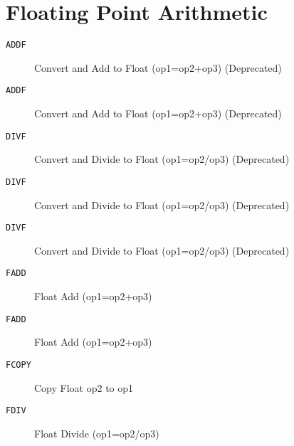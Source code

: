 \section{Floating Point Arithmetic}
\begin{description}
\item[\texttt{ADDF}]  Convert and Add to Float (op1=op2+op3) (Deprecated)\\

\end{description}
\begin{description}
\item[\texttt{ADDF}]  Convert and Add to Float (op1=op2+op3) (Deprecated)\\

\end{description}
\begin{description}
\item[\texttt{DIVF}]  Convert and Divide to Float (op1=op2/op3) (Deprecated)\\

\end{description}
\begin{description}
\item[\texttt{DIVF}]  Convert and Divide to Float (op1=op2/op3) (Deprecated)\\

\end{description}
\begin{description}
\item[\texttt{DIVF}]  Convert and Divide to Float (op1=op2/op3) (Deprecated)\\

\end{description}
\begin{description}
\item[\texttt{FADD}]  Float Add (op1=op2+op3)\\

\end{description}
\begin{description}
\item[\texttt{FADD}]  Float Add (op1=op2+op3)\\

\end{description}
\begin{description}
\item[\texttt{FCOPY}]  Copy Float op2 to op1\\

\end{description}
\begin{description}
\item[\texttt{FDIV}]  Float Divide (op1=op2/op3)\\

\end{description}
